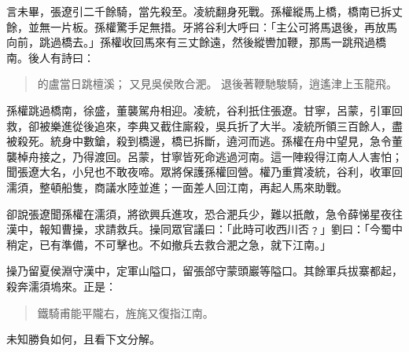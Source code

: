 言未畢，張遼引二千餘騎，當先殺至。凌統翻身死戰。孫權縱馬上橋，橋南已拆丈餘，並無一片板。孫權驚手足無措。牙將谷利大呼曰：「主公可將馬退後，再放馬向前，跳過橋去。」孫權收回馬來有三丈餘遠，然後縱轡加鞭，那馬一跳飛過橋南。後人有詩曰：

\begin{quote}
的盧當日跳檀溪；
又見吳侯敗合淝。
退後著鞭馳駿騎，逍遙津上玉龍飛。
\end{quote}

孫權跳過橋南，徐盛，董襲駕舟相迎。凌統，谷利扺住張遼。甘寧，呂蒙，引軍回救，卻被樂進從後追來，李典又截住廝殺，吳兵折了大半。凌統所領三百餘人，盡被殺死。統身中數鎗，殺到橋邊，橋已拆斷，遶河而逃。孫權在舟中望見，急令董襲棹舟接之，乃得渡回。呂蒙，甘寧皆死命逃過河南。這一陣殺得江南人人害怕；聞張遼大名，小兒也不敢夜啼。眾將保護孫權回營。權乃重賞凌統，谷利，收軍回濡須，整頓船隻，商議水陸並進；一面差人回江南，再起人馬來助戰。

卻說張遼聞孫權在濡須，將欲興兵進攻，恐合淝兵少，難以扺敵，急令薛悌星夜往漢中，報知曹操，求請救兵。操同眾官議曰：「此時可收西川否﹖」劉曰：「今蜀中稍定，已有準備，不可擊也。不如撤兵去救合淝之急，就下江南。」

操乃留夏侯淵守漢中，定軍山隘口，留張郃守蒙頭巖等隘口。其餘軍兵拔寨都起，殺奔濡須塢來。正是：

\begin{quote}
鐵騎甫能平隴右，旌旄又復指江南。
\end{quote}

未知勝負如何，且看下文分解。
